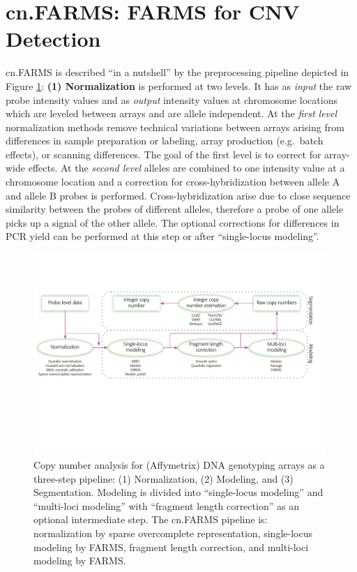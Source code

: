 \documentclass[article]{bioinf}
\begin{document}
\section{cn.FARMS: FARMS for CNV Detection}
\label{sec:farmspipeline}
cn.FARMS is described ``in a nutshell''  by the preprocessing pipeline depicted
in Figure \ref{fig:preprocess_chain_fig}:\linebreak
{\bf (1) Normalization} is performed at two levels.
It has as {\em input} the raw probe intensity values and
as {\em output} intensity values at chromosome locations
which are leveled between arrays and are allele independent.
At the {\em first level} normalization methods 
remove technical variations between arrays arising from 
differences in sample preparation or labeling, 
array production (e.g.\ batch effects), or scanning differences.
The goal of the first level is to correct for array-wide effects.
At the {\em second level} alleles are combined to one intensity
value at a chromosome location and a correction for
cross-hybridization between allele A and allele B probes is
performed.
Cross-hybridization arise due to close 
sequence similarity between the probes of different alleles, therefore a
probe of one allele picks up a signal of the other allele.
The optional corrections for differences in
PCR yield can be
performed at this step or after ``single-locus
modeling''.
\begin{figure}[!b]
\begin{center}
\includegraphics[angle=0,width=0.99\textwidth]{figures/figure2}
\caption{Copy number analysis for (Affymetrix) DNA genotyping arrays
as a three-step pipeline: (1) Normalization, (2) Modeling, and (3) Segmentation.
Modeling is divided into ``single-locus modeling'' and ``multi-loci
modeling'' with ``fragment length
correction'' as an optional intermediate step. 
The cn.FARMS pipeline is: normalization by sparse
overcomplete representation, single-locus modeling by FARMS, fragment length
correction, and multi-loci modeling by FARMS. 
\label{fig:preprocess_chain_fig}}
\end{center}
\end{figure} 
\end{document}
